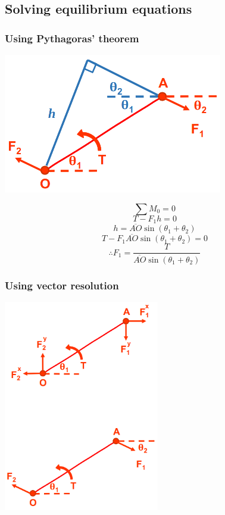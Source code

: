 \documentclass[11pt]{article}
\begin{document}
\subsection{Solving equilibrium equations}
\label{sec:org994b703}

\subsubsection{Using Pythagoras' theorem}
\label{sec:orgf512c5a}
\begin{center}
\includegraphics[width=.9\linewidth]{./images/solving-equilibrium-equations-using-pythagoras-theorem.png}
\end{center}

\[\sum M_0 = 0\]
\[T - F_1 h = 0\]
\[h = \overline{AO} \sin (\theta_1 + \theta_2)\]
\[T - F_1 \overline{AO} \sin (\theta_1 + \theta_2) = 0\]
\[\therefore F_1 = \frac{T}{\overline{AO} \sin (\theta_1 + \theta_2)}\]
\subsubsection{Using vector resolution}
\label{sec:orgc6043d1}
\begin{center}
\includegraphics[height=25em]{./images/solving-equilibrium-equations-using-vector-resolution.png}
\end{center}
\end{document}
